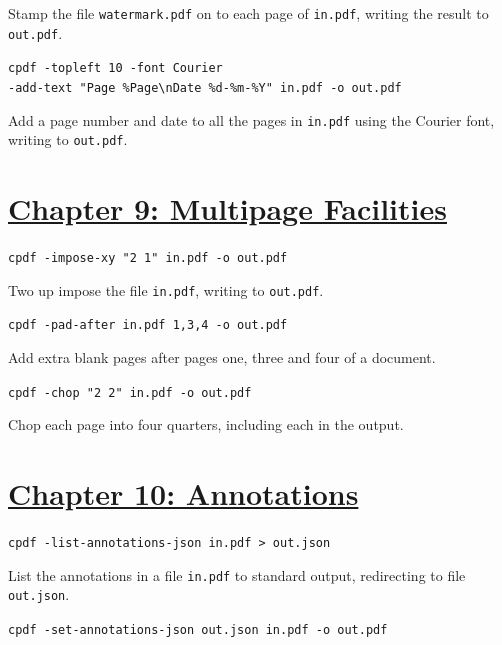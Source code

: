 \documentclass{book}
\begin{document}
\noindent Stamp the file \texttt{watermark.pdf} on to each page of \texttt{in.pdf}, writing the result to \texttt{out.pdf}.

\begin{framed}\noindent\texttt{cpdf -topleft 10 -font Courier\\ \phantom{\ \ \ \ } -add-text "Page \%Page\textbackslash nDate \%d-\%m-\%Y" in.pdf -o out.pdf}\end{framed}

\noindent Add a page number and date to all the pages in \texttt{in.pdf} using the Courier font, writing to \texttt{out.pdf}.

\section*{\hyperref[chap:9]{Chapter 9: Multipage Facilities}}

\begin{framed}\noindent\texttt{cpdf -impose-xy "2 1" in.pdf -o out.pdf}\end{framed}

\noindent Two up impose the file \texttt{in.pdf}, writing to \texttt{out.pdf}.

\begin{framed}\noindent\texttt{cpdf -pad-after in.pdf 1,3,4 -o out.pdf}\end{framed}

\noindent Add extra blank pages after pages one, three and four of a document.

\begin{framed}\noindent\texttt{cpdf -chop "2 2" in.pdf -o out.pdf}\end{framed}

\noindent Chop each page into four quarters, including each in the output.

\section*{\hyperref[chap:10]{Chapter 10: Annotations}}

\begin{framed}\noindent\texttt{cpdf -list-annotations-json in.pdf > out.json}\end{framed}

\noindent List the annotations in a file \texttt{in.pdf} to standard output, redirecting to file \texttt{out.json}.

\begin{framed}\noindent\texttt{cpdf -set-annotations-json out.json in.pdf -o out.pdf}\end{framed}
\end{document}
